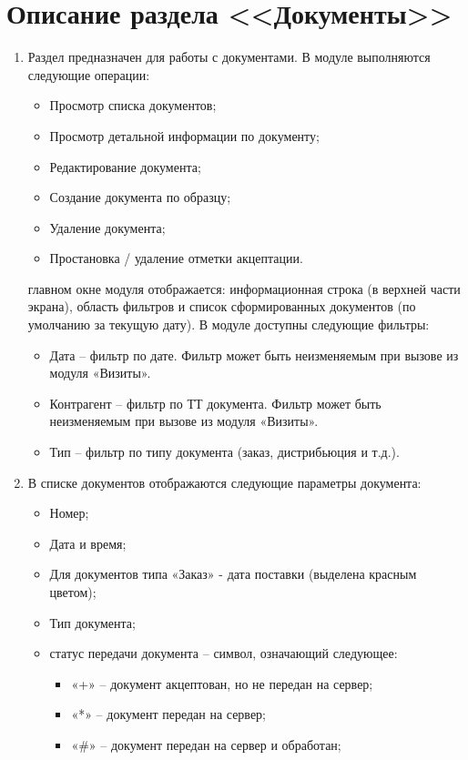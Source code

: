 \section{Описание раздела <<Документы>>}
\begin{enumerate}[\thesection .1]
\item Раздел предназначен для работы с документами.
В модуле выполняются следующие операции:
\begin{itemize}
	\item Просмотр списка документов;
	\item Просмотр детальной информации по документу;
	\item Редактирование документа;
	\item Создание документа по образцу; 
	\item Удаление документа;
	\item Простановка / удаление отметки акцептации.
\end{itemize}
 главном окне модуля отображается: информационная строка (в верхней части экрана), область фильтров и список сформированных документов (по умолчанию за текущую дату). 
В модуле доступны следующие фильтры: 
	\begin{itemize} 
	\item Дата – фильтр по дате. Фильтр может быть неизменяемым при вызове из модуля «Визиты».
	\item Контрагент – фильтр по ТТ документа. Фильтр может быть неизменяемым при вызове из модуля «Визиты».
	\item Тип – фильтр по типу документа (заказ, дистрибьюция и т.д.).
	\end{itemize}		  
\item В списке документов отображаются следующие параметры документа:
\begin{itemize}
	\item Номер;
	\item Дата и время;
	\item Для документов типа «Заказ» - дата поставки (выделена красным цветом);
	\item Тип документа;	
	\item статус передачи документа – символ, означающий следующее:
	\begin{itemize}
		\item «+» – документ акцептован, но не передан на сервер;
		\item «*» – документ передан на сервер;
		\item «\#» – документ передан на сервер и обработан;

\end{itemize}
\end{itemize}
\end{enumerate}

